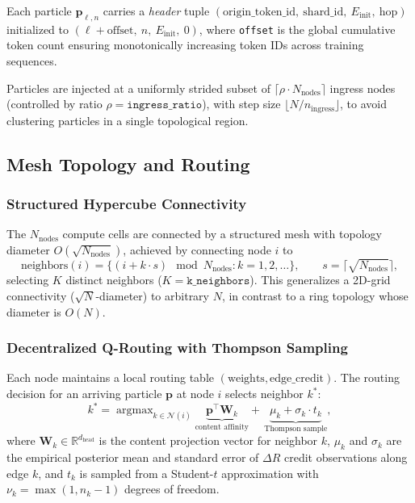 \documentclass[11pt,a4paper]{article}
\theoremstyle{definition}
\newcommand{\vp}{\mathbf{p}}
\newcommand{\mW}{\mathbf{W}}
\newcommand{\R}{\mathbb{R}}
\DeclareMathOperator*{\argmax}{argmax}
\begin{document}
Each particle $\vp_{\ell,n}$ carries a \emph{header} tuple
$(\text{origin\_token\_id},\ \text{shard\_id},\ E_\text{init},\ \text{hop})$ initialized to
$(\ell + \text{offset},\ n,\ E_\text{init},\ 0)$, where \texttt{offset} is the global cumulative
token count ensuring monotonically increasing token IDs across training sequences.

Particles are injected at a uniformly strided subset of $\lceil \rho \cdot N_\text{nodes} \rceil$
ingress nodes (controlled by ratio $\rho = \texttt{ingress\_ratio}$), with step size
$\lfloor N / n_\text{ingress} \rfloor$, to avoid clustering particles in a single topological region.

\subsection{Mesh Topology and Routing}
\label{sec:mesh}

\subsubsection{Structured Hypercube Connectivity}

The $N_\text{nodes}$ compute cells are connected by a structured mesh with topology diameter
$O(\sqrt{N_\text{nodes}})$, achieved by connecting node $i$ to
\begin{equation}
  \text{neighbors}(i) = \bigl\{(i + k \cdot s)\!\!\!\mod N_\text{nodes}
    : k = 1, 2, \ldots\bigr\},
  \qquad s = \lceil\sqrt{N_\text{nodes}}\rceil,
  \label{eq:topology}
\end{equation}
selecting $K$ distinct neighbors ($K = \texttt{k\_neighbors}$).
This generalizes a 2D-grid connectivity ($\sqrt{N}$-diameter) to arbitrary $N$,
in contrast to a ring topology whose diameter is $O(N)$.

\subsubsection{Decentralized Q-Routing with Thompson Sampling}

Each node maintains a local routing table $(\text{weights}, \text{edge\_credit})$.
The routing decision for an arriving particle $\vp$ at node $i$ selects neighbor $k^*$:
\begin{equation}
  k^* = \argmax_{k \in \mathcal{N}(i)}
  \underbrace{\vp^\top \mW_k}_{\text{content affinity}}
  +\, \underbrace{\mu_k + \sigma_k \cdot t_k}_{\text{Thompson sample}},
  \label{eq:routing}
\end{equation}
where $\mW_k \in \R^{d_\text{head}}$ is the content projection vector for neighbor $k$,
$\mu_k$ and $\sigma_k$ are the empirical posterior mean and standard error of $\Delta R$ credit
observations along edge $k$, and $t_k$ is sampled from a Student-$t$ approximation with $\nu_k = \max(1, n_k - 1)$ degrees of freedom.
\end{document}
